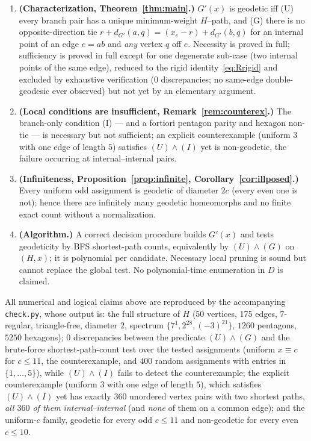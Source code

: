 \documentclass{amsart}
\theoremstyle{definition}
\begin{document}
\begin{enumerate}
\item \textbf{(Characterization, Theorem~\ref{thm:main}.)} $G'(x)$ is
geodetic iff (U) every branch pair has a unique minimum-weight $H$--path, and
(G) there is no opposite-direction tie
$r+d_{G'}(a,q)=(x_e-r)+d_{G'}(b,q)$ for an internal point of an edge $e=ab$ and
\emph{any} vertex $q$ off $e$. Necessity is proved in full; sufficiency is proved
in full except for one degenerate sub-case (two internal points of the same edge),
reduced to the rigid identity~\eqref{eq:Rrigid} and excluded by exhaustive
verification ($0$ discrepancies; no same-edge double-geodesic ever observed) but
not yet by an elementary argument.
\item \textbf{(Local conditions are insufficient,
Remark~\ref{rem:counterex}.)} The branch-only condition (I) --- and a fortiori
pentagon parity and hexagon non-tie --- is necessary but not sufficient; an
explicit counterexample (uniform $3$ with one edge of length $5$) satisfies
$(U)\wedge(I)$ yet is non-geodetic, the failure occurring at internal--internal
pairs.
\item \textbf{(Infiniteness, Proposition~\ref{prop:infinite},
Corollary~\ref{cor:illposed}.)} Every uniform odd assignment is geodetic of
diameter $2c$ (every even one is not); hence there are infinitely many geodetic
homeomorphs and no finite exact count without a normalization.
\item \textbf{(Algorithm.)} A correct decision procedure builds $G'(x)$ and
tests geodeticity by BFS shortest-path counts, equivalently by $(U)\wedge(G)$ on
$(H,x)$; it is polynomial per candidate. Necessary local pruning is sound but
cannot replace the global test. No polynomial-time enumeration in $D$ is claimed.
\end{enumerate}

All numerical and logical claims above are reproduced by the accompanying
\texttt{check.py}, whose output is: the full structure of $H$ (50 vertices, 175
edges, $7$-regular, triangle-free, diameter $2$, spectrum
$\{7^1,2^{28},(-3)^{21}\}$, $1260$ pentagons, $5250$ hexagons); $0$ discrepancies
between the predicate $(U)\wedge(G)$ and the brute-force shortest-path-count test
over the tested assignments (uniform $x\equiv c$ for $c\le 11$, the
counterexample, and $400$ random assignments with entries in $\{1,\dots,5\}$),
while $(U)\wedge(I)$ fails to detect the counterexample; the explicit
counterexample (uniform $3$ with one edge of length $5$), which satisfies
$(U)\wedge(I)$ yet has exactly $360$ unordered vertex pairs with two shortest
paths, \emph{all $360$ of them internal--internal} (and \emph{none} of them on a
common edge); and the uniform-$c$ family, geodetic for every odd $c\le11$ and
non-geodetic for every even $c\le10$.
\end{document}
